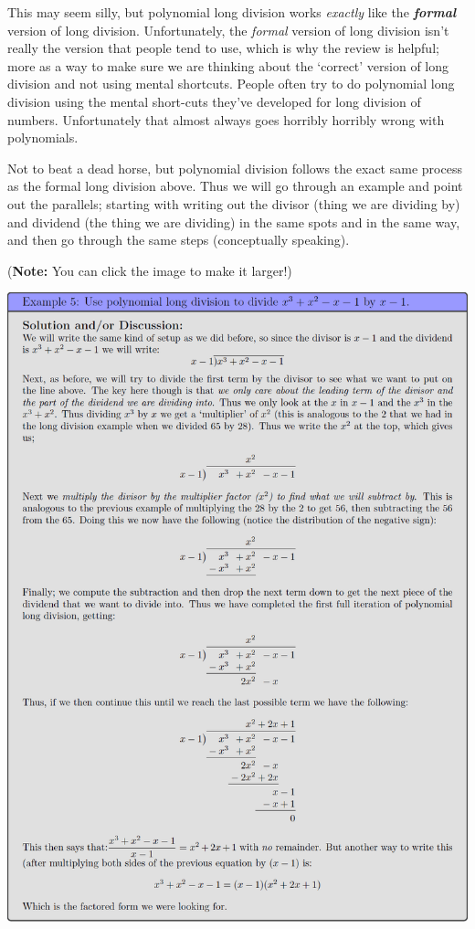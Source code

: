 \documentclass{ximera}
\begin{document}
    This may seem silly, but polynomial long division works \textit{exactly} like the \textit{\textbf{formal}} version of long division. Unfortunately, the \textit{formal} version of long division isn't really the version that people tend to use, which is why the review is helpful; more as a way to make sure we are thinking about the `correct' version of long division and not using mental shortcuts. People often try to do polynomial long division using the mental short-cuts they've developed for long division of numbers. Unfortunately that almost always goes horribly horribly wrong with polynomials.
    
    Not to beat a dead horse, but polynomial division follows the exact same process as the formal long division above. Thus we will go through an example and point out the parallels; starting with writing out the divisor (thing we are dividing by) and dividend (the thing we are dividing) in the same spots and in the same way, and then go through the same steps (conceptually speaking).
    
    \iftikzexport(\textbf{Note:} You can click the image to make it larger!)\fi
    \begin{image}
        \includegraphics[width=\textwidth]{exPolyLongDivision.png}
    \end{image}
    
\end{document}
